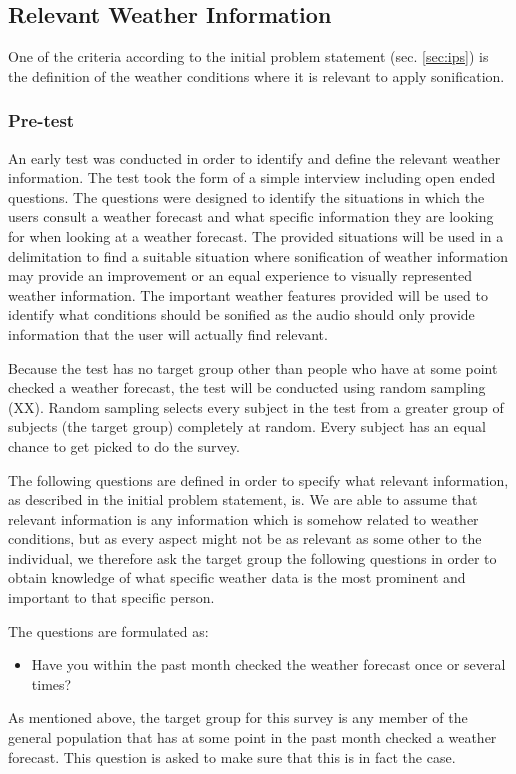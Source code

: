 \subsection{Relevant Weather Information} \label{sec:relevantweatherinformation}
One of the criteria according to the initial problem statement (sec. \ref{sec:ips}) is the definition of the weather conditions where it is relevant to apply sonification.

\subsubsection{Pre-test} \label{sec:pretest} 
An early test was conducted in order to identify and define the relevant weather information. 
The test took the form of a simple interview including open ended questions.
The questions were designed to identify the situations in which the users consult a weather forecast and what specific information they are looking for when looking at a weather forecast.
The provided situations will be used in a delimitation to find a suitable situation where sonification of weather information may provide an improvement or an equal experience to visually represented weather information.
The important weather features provided will be used to identify what conditions should be sonified as the audio should only provide information that the user will actually find relevant.
\bigskip

Because the test has no target group other than people who have at some point checked a weather forecast, the test will be conducted using random sampling (XX). 
Random sampling selects every subject in the test from a greater group of subjects (the target group) completely at random.
Every subject has an equal chance to get picked to do the survey.
\bigskip

The following questions are defined in order to specify what relevant information, as described in the initial problem statement, is. 
We are able to assume that relevant information is any information which is somehow related to weather conditions, but as every aspect might not be as relevant as some other to the individual, we therefore ask the target group the following questions in order to obtain knowledge of what specific weather data is the most prominent and important to that specific person.

The questions are formulated as:
\begin{itemize}
\item Have you within the past month checked the weather forecast once or several times?
\end{itemize}
As mentioned above, the target group for this survey is any member of the general population that has at some point in the past month checked a weather forecast.
This question is asked to make sure that this is in fact the case.

